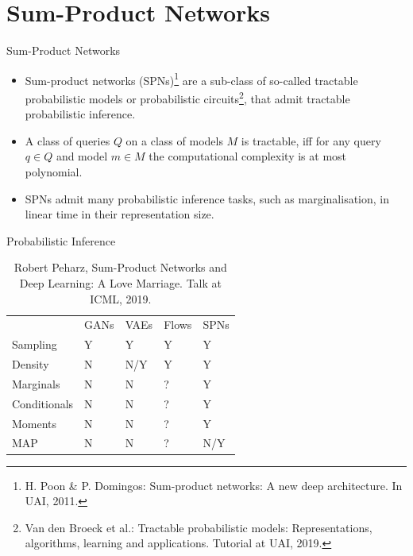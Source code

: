 \section{Sum-Product Networks}

\begin{frame}{Sum-Product Networks}
\begin{itemize}
    \item Sum-product networks (SPNs)\footnote{\scriptsize H. Poon \& P. Domingos: Sum-product networks: A new deep architecture. In UAI, 2011.} are a sub-class of so-called tractable probabilistic models or probabilistic circuits\footnote{\scriptsize Van den Broeck et al.: Tractable probabilistic models: Representations, algorithms, learning and applications. Tutorial at UAI, 2019.}, that admit tractable probabilistic inference.
    \item A class of queries $Q$ on a class of models $M$ is tractable, iff for any query $q \in Q$ and model $m \in M$ the computational complexity is at most polynomial.
    \item SPNs admit many probabilistic inference tasks, such as marginalisation, in linear time in their representation size.
\end{itemize}
\end{frame}

\begin{frame}{Probabilistic Inference}
\begin{table}
\centering
\begin{tabular}{lllll}
             & GANs & VAEs & Flows & SPNs  \\
Sampling     & Y    & Y    & Y     & Y      \\
Density      & N    & N/Y  & Y     & Y      \\
Marginals    & N    & N    & ?     & Y      \\
Conditionals & N    & N    & ?     & Y      \\
Moments      & N    & N    & ?     & Y      \\
MAP          & N    & N    & ?     & N/Y
\end{tabular}
\caption{\scriptsize Robert Peharz, Sum-Product Networks and Deep Learning: A Love Marriage. Talk at ICML, 2019.}
\end{table}
\end{frame}

